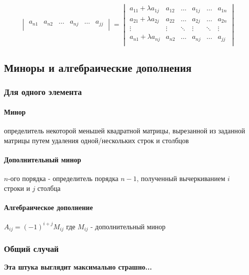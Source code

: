 \documentclass[class=article,a4paper,12pt,crop=false]{standalone}
\begin{document}
\begin{enumerate}
{\begin{equation}
\begin{vmatrix}
        a_{n1} & a_{n2} & \dots & a_{nj} & \dots & a_{jj} \\
      \end{vmatrix}
      =
      \begin{vmatrix}
        a_{11} + \lambda a_{1j} & a_{12} & \dots & a_{1j} & \dots & a_{1n} \\
        a_{21} + \lambda a_{2j} & a_{22} & \dots & a_{2j} & \dots & a_{2n} \\
        \vdots & \vdots & \ddots & \vdots & \ddots & \vdots \\
        a_{n1} + \lambda a_{nj} & a_{n2} & \dots & a_{nj} & \dots & a_{jj} \\
      \end{vmatrix}
    \end{equation}
  }
\end{enumerate}

\subsection{Миноры и алгебраические дополнения}

\subsubsection{Для одного элемента}

\paragraph{Минор} определитель некоторой меньшей квадратной матрицы, вырезанной из заданной матрицы путем удаления одной/нескольких строк и столбцов
\paragraph{Дополнительный минор} $n$-ого порядка - определитель порядка $n - 1$, полученный вычеркиванием $i$ строки и $j$ столбца
\paragraph{Алгебраическое дополнение} $A_{ij} = (-1)^{i + j}M_{ij}$ где $M_{ij}$ - дополнительный минор

\subsubsection{Общий случай}

\textbf{Эта штука выглядит максимально страшно...}
\end{document}
